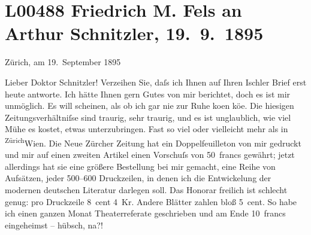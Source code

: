 

\section[Friedrich M. Fels an Arthur Schnitzler, 19. 9. 1895]{L00488 Friedrich M. Fels an Arthur Schnitzler, 19. 9. 1895}
\nopagebreak{}
\rehead{ }\normalsize\beginnumbering{}
\toendnotes[C]{\smallbreak\pagebreak[2]}
\toendnotes[C]{\smallbreak}
\toendnotes[C]{\smallbreak}
\pstart
           \raggedleft{}{\pb}Zürich, am 19. September 1895\pend
           
\pstart\center{}Lieber Doktor Schnitzler!\pend\vspace{0.5em}
\pstart
           Verzeihen Sie, daſs ich Ihnen auf Ihren Ischler
               Brief erst heute antworte. Ich hätte Ihnen gern Gutes von mir berichtet, doch es ist
               mir unmöglich. Es will scheinen, als ob ich gar nie zur Ruhe ko{\geminationm}en kö{\geminationn}e. Die hiesigen
               Zeitungsverhältniſse sind traurig, sehr traurig, und es ist unglaublich, wie viel
               Mühe es kostet, etwas unterzubringen. Fast so viel oder vielleicht mehr als in \substVorne{}\textsuperscript{Zürich}\substDazwischen{}Wien\substHinten{}. Die Neue Zürcher Zeitung hat ein Doppelfeuilleton von mir
               gedruckt und mir auf einen zweiten Artikel einen Vorschuſs von 50 francs gewährt;
               jetzt allerdings hat sie eine größere Bestellung bei mir gemacht, eine Reihe von
               Aufsätzen, jeder 500–600 Druckzeilen, in denen ich die Entwickelung der modernen
               deutschen Literatur darlegen soll. Das Honorar freilich ist schlecht genug: pro
               Druckzeile 8 cent 4 Kr. Andere Blätter zahlen bloß 5 cent. So habe ich einen ganzen
               Monat Theaterreferate geschrieben und am Ende 10 francs eingeheimst – hübsch,
               na?!\pend
           
